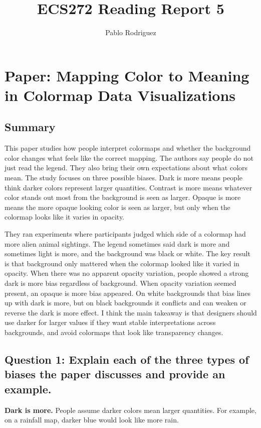 \documentclass[11pt]{article}
\title{ECS272 Reading Report 5}
\author{Pablo Rodriguez}
\date{}
\begin{document}
\maketitle

\section*{Paper: Mapping Color to Meaning in Colormap Data Visualizations}

\subsection*{Summary}

This paper studies how people interpret colormaps and whether the background color changes what feels like the correct mapping. The authors say people do not just read the legend. They also bring their own expectations about what colors mean. The study focuses on three possible biases. Dark is more means people think darker colors represent larger quantities. Contrast is more means whatever color stands out most from the background is seen as larger. Opaque is more means the more opaque looking color is seen as larger, but only when the colormap looks like it varies in opacity.

They ran experiments where participants judged which side of a colormap had more alien animal sightings. The legend sometimes said dark is more and sometimes light is more, and the background was black or white. The key result is that background only mattered when the colormap looked like it varied in opacity. When there was no apparent opacity variation, people showed a strong dark is more bias regardless of background. When opacity variation seemed present, an opaque is more bias appeared. On white backgrounds that bias lines up with dark is more, but on black backgrounds it conflicts and can weaken or reverse the dark is more effect. I think the main takeaway is that designers should use darker for larger values if they want stable interpretations across backgrounds, and avoid colormaps that look like transparency changes.

\subsection*{Question 1: Explain each of the three types of biases the paper discusses and provide an example.}

\textbf{Dark is more.} People assume darker colors mean larger quantities. For example, on a rainfall map, darker blue would look like more rain.
\end{document}
